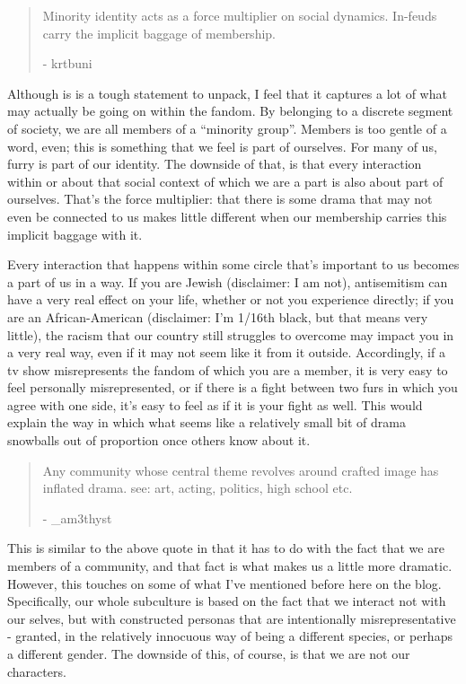 \begin{quote}
Minority identity acts as a force multiplier on social dynamics.
In-feuds carry the implicit baggage of membership.

- krtbuni
\end{quote}

Although is is a tough statement to unpack, I feel that it captures a
lot of what may actually be going on within the fandom. By belonging to
a discrete segment of society, we are all members of a ``minority
group''. Members is too gentle of a word, even; this is something that
we feel is part of ourselves. For many of us, furry is part of our
identity. The downside of that, is that every interaction within or
about that social context of which we are a part is also about part of
ourselves. That's the force multiplier: that there is some drama that
may not even be connected to us makes little different when our
membership carries this implicit baggage with it.

Every interaction that happens within some circle that's important to us
becomes a part of us in a way. If you are Jewish (disclaimer: I am not),
antisemitism can have a very real effect on your life, whether or not
you experience directly; if you are an African-American (disclaimer: I'm
1/16th black, but that means very little), the racism that our country
still struggles to overcome may impact you in a very real way, even if
it may not seem like it from it outside. Accordingly, if a tv show
misrepresents the fandom of which you are a member, it is very easy to
feel personally misrepresented, or if there is a fight between two furs
in which you agree with one side, it's easy to feel as if it is your
fight as well. This would explain the way in which what seems like a
relatively small bit of drama snowballs out of proportion once others
know about it.

\begin{quote}
Any community whose central theme revolves around crafted image has
inflated drama. see: art, acting, politics, high school etc.

- \_am3thyst
\end{quote}

This is similar to the above quote in that it has to do with the fact
that we are members of a community, and that fact is what makes us a
little more dramatic. However, this touches on some of what I've
mentioned before here on the blog. Specifically, our whole subculture is
based on the fact that we interact not with our selves, but with
constructed personas that are intentionally misrepresentative - granted,
in the relatively innocuous way of being a different species, or perhaps
a different gender. The downside of this, of course, is that we are not
our characters.

